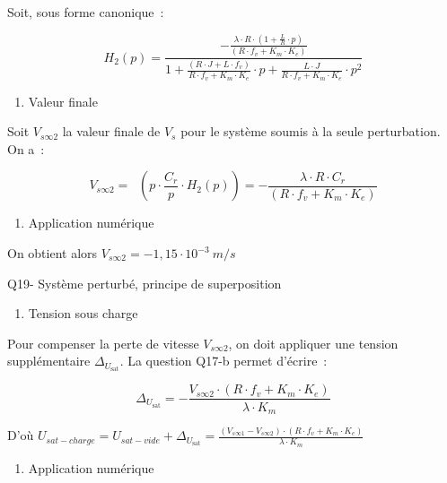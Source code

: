 \documentclass[]{article}
\begin{document}
Soit, sous forme canonique~:

\[H_{2}\left( p \right) = \frac{- \frac{\lambda \cdot R \cdot \left( 1 + \frac{L}{R} \cdot p \right)}{\left( R \cdot f_{v} + K_{m} \cdot K_{e} \right)}}{1 + \frac{\left( R \cdot J + L \cdot f_{v} \right)}{R \cdot f_{v} + K_{m} \cdot K_{e}} \cdot p + \frac{L \cdot J}{R \cdot f_{v} + K_{m} \cdot K_{e}} \cdot p^{2}}\]

\begin{enumerate}
\def\labelenumi{\alph{enumi}.}
\item
  Valeur finale
\end{enumerate}

Soit \(V_{s\infty 2}\) la valeur finale de \(V_{s}\) pour le système
soumis à la seule perturbation. On a~:

\[V_{s\infty 2} = \operatorname{}{\left( p \cdot \frac{C_{r}}{p} \cdot H_{2}\left( p \right) \right) = - \frac{\lambda \cdot R \cdot C_{r}}{\left( R \cdot f_{v} + K_{m} \cdot K_{e} \right)}}\]

\begin{enumerate}
\def\labelenumi{\alph{enumi}.}
\item
  Application numérique
\end{enumerate}

On obtient alors \(V_{s\infty 2} = - 1,15 \cdot 10^{- 3}\ m \slash s\)

Q19- Système perturbé, principe de superposition

\begin{enumerate}
\def\labelenumi{\alph{enumi}.}
\item
  Tension sous charge
\end{enumerate}

Pour compenser la perte de vitesse \(V_{s\infty 2}\), on doit appliquer
une tension supplémentaire \(\Delta_{U_{\text{sat}}}\). La question
Q17-b permet d'écrire~:

\[\Delta_{U_{\text{sat}}} = - \frac{V_{s\infty 2} \cdot \left( R \cdot f_{v} + K_{m} \cdot K_{e} \right)}{\lambda \cdot K_{m}}\]

D'où
\(U_{sat - charge} = U_{sat - vide} + \Delta_{U_{\text{sat}}} = \frac{\left( V_{s\infty 1} - V_{s\infty 2} \right) \cdot \left( R \cdot f_{v} + K_{m} \cdot K_{e} \right)}{\lambda \cdot K_{m}}\)

\begin{enumerate}
\def\labelenumi{\alph{enumi}.}
\item
  Application numérique
\end{enumerate}
\end{document}

